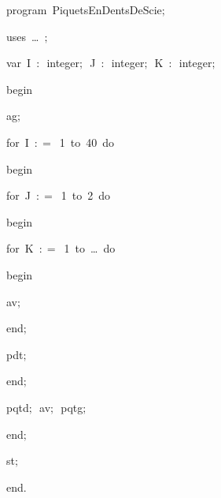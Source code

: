 
{
\parindent {}
\medskip

\carrenoir
\vspace{\neglskip}\mbox{\blc  \idt  \mcl program\idt \ PiquetsEnDentsDeScie$;$
}\par 
\vspace{\neglskip}\mbox{\blc \blk\idt \mcl uses\idt \ \ldots\ $;$
}\par 
\pagebreak[3] 
\vspace{\neglskip}\mbox{\blc  \blk\idt  \mcl var\idt \ I\ $:$\ integer$;$\ J\ $:$\ integer$;$\ K\ $:$\ integer$;$}\par 
\vspace{\neglskip}\mbox{\blc  \idt  \mcl begin\idt }\par 
\vspace{\neglskip}\mbox{\blc  \blk\idt  ag$;$}\par 
\pagebreak[3] 
\vspace{\neglskip}\mbox{\blc  \blk\idt  \mcl for\idt \ I\ $:$$=$\ 1\ \mcl to\idt \ 40\ \mcl do\idt }\par 
\vspace{\neglskip}\mbox{\blc  \blk\blk\idt  \mcl begin\idt }\par 
\pagebreak[3] 
\vspace{\neglskip}\mbox{\blc  \blk\blk\blk\idt  \mcl for\idt \ J\ $:$$=$\ 1\ \mcl to\idt \ 2\ \mcl do\idt }\par 
\vspace{\neglskip}\mbox{\blc  \blk\blk\blk\blk\idt  \mcl begin\idt }\par 
\pagebreak[3] 
\vspace{\neglskip}\mbox{\blc  \blk\blk\blk\blk\blk\idt  \mcl for\idt \ K\ $:$$=$\ 1\ \mcl to\idt \ \ldots\ \mcl do\idt }\par 
\vspace{\neglskip}\mbox{\blc  \blk\blk\blk\blk\blk\blk\idt  \mcl begin\idt }\par 
\vspace{\neglskip}\mbox{\blc  \blk\blk\blk\blk\blk\blk\blk\idt  av$;$}\par 
\vspace{\neglskip}\mbox{\blc  \blk\blk\blk\blk\blk\blk\idt  \mcl end\idt $;$}\par 
\vspace{\neglskip}\mbox{\blc  \blk\blk\blk\blk\blk\idt  pdt$;$}\par 
\vspace{\neglskip}\mbox{\blc  \blk\blk\blk\blk\idt  \mcl end\idt $;$}\par 
\vspace{\neglskip}\mbox{\blc  \blk\blk\blk\idt  pqtd$;$\ av$;$\ pqtg$;$\ }\par 
\vspace{\neglskip}\mbox{\blc  \blk\blk\idt  \mcl end\idt $;$}\par 
\vspace{\neglskip}\mbox{\blc  \blk\idt  st$;$}\par 
\vspace{\neglskip}\mbox{\blc  \idt  \mcl end\idt $.$}\par 

\medskip }

